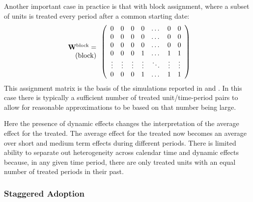 \documentclass[letterpaper,12pt,leqno]{article}
\newcommand{\block}{{\rm block}}
\newcommand{\ttock}{1}
\newcommand{\ttick}{0}
\newcommand{\bw}{{\bf W}}
\begin{document}
Another important case in practice is that with block assignment, where a subset of units is treated  every period after a common starting date:
\[ 
\begin{array}{r}\bw^\block=\\ 
({\rm block})
\end{array}\left(
\begin{array}{ccccccccc}
	\ttick & \ttick & \ttick  & \ttick & \dots & \ttick  & \ttick\\
	\ttick  & \ttick & \ttick & \ttick   & \dots & \ttick  & \ttick \\
	\ttick  & \ttick & \ttick  & \ttick  & \dots & \ttick  & \ttick \\
	\ttick  & \ttick & \ttick & {\ttock}   & \dots & {\ttock}  & {\ttock} \\
	\vdots   &  \vdots  &  \vdots& \vdots &\ddots &\vdots &\vdots\\
	\ttick  & \ttick & \ttick   & {\ttock} & \dots & {\ttock} & {\ttock}  \\
\end{array}
\right)\]
This assignment matrix is the basis of the simulations reported in 
\citep{Bertrand2004did} and \citep{ arkhangelsky2021synthetic}. In this case there is typically a sufficient number of treated unit/time-period pairs to allow for reasonable approximations to be based on that number being large. 

Here the presence of dynamic effects changes the interpretation of the average effect for the treated. The average effect for the treated now becomes an average over short and medium term effects during different periods. There is limited ability to separate out heterogeneity across calendar time and dynamic effects because, in any given time period, there are only treated units with an equal number of treated periods in their past.

\subsubsection{Staggered Adoption}\label{staggered}
\end{document}
